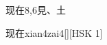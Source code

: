 \begin{entry}{现在}{8,6}{⾒、⼟}
  \begin{phonetics}{现在}{xian4zai4}[][HSK 1]
  \end{phonetics}
\end{entry}
